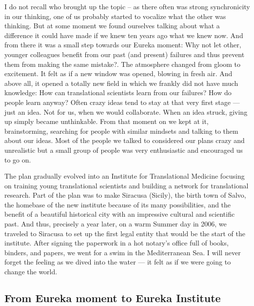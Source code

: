 \documentclass[authordate, editorial, issue]{jote-new-article}
\begin{document}
	I do not recall who brought up the topic -- as there often was strong synchronicity in our thinking, one of us probably started to vocalize what the other was thinking. But at some moment we found ourselves talking about what a difference it could have made if we knew ten years ago what we knew now. And from there it was a small step towards our Eureka moment: Why not let other, younger colleagues benefit from our past (and present) failures and thus prevent them from making the same mistake?. The atmosphere changed from gloom to excitement. It felt as if a new window was opened, blowing in fresh air. And above all, it opened a totally new field in which we frankly did not have much knowledge: How can translational scientists learn from our failures? How do people learn anyway? Often crazy ideas tend to stay at that very first stage — just an idea. Not for us, when we would collaborate. When an idea struck, giving up simply became unthinkable. From that moment on we kept at it, brainstorming, searching for people with similar mindsets and talking to them about our ideas. Most of the people we talked to considered our plans crazy and unrealistic but a small group of people was very enthusiastic and encouraged us to go on.



	The plan gradually evolved into an Institute for Translational Medicine focusing on training young translational scientists and building a network for translational research. Part of the plan was to make Siracusa (Sicily), the birth town of Salvo, the homebase of the new institute because of its many possibilities, and the benefit of a beautiful historical city with an impressive cultural and scientific past. And thus, precisely a year later, on a warm Summer day in 2006, we traveled to Siracusa to set up the first legal entity that would be the start of the institute. After signing the paperwork in a hot notary's office full of books, binders, and papers, we went for a swim in the Mediterranean Sea. I will never forget the feeling as we dived into the water — it felt as if we were going to change the world.







	\subsection{From Eureka moment to Eureka Institute}
\end{document}
